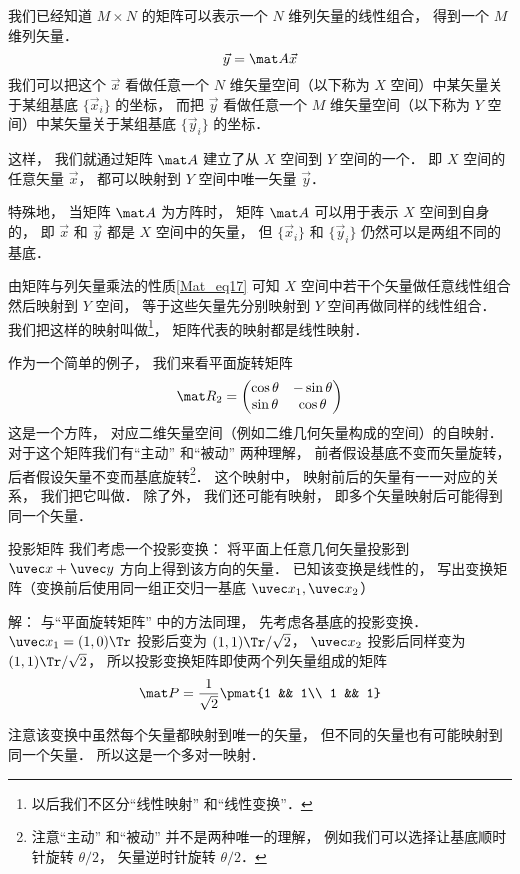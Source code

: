 

我们已经知道 $M\times N$ 的矩阵可以表示一个 $N$ 维列矢量的线性组合， 得到一个 $M$ 维列矢量．
\begin{equation}\label{MatLS_eq1}
\vec y = \mat A \vec x
\end{equation}
我们可以把这个 $\vec x$ 看做任意一个 $N$ 维矢量空间（以下称为 $X$ 空间）中某矢量关于某组基底 $\{\vec x_i\}$ 的坐标， 而把 $\vec y$ 看做任意一个 $M$ 维矢量空间（以下称为 $Y$ 空间）中某矢量关于某组基底 $\{\vec y_i\}$ 的坐标．

这样， 我们就通过矩阵 $\mat A$ 建立了从 $X$ 空间到 $Y$ 空间的一个． 即 $X$ 空间的任意矢量 $\vec x$， 都可以映射到 $Y$ 空间中唯一矢量 $\vec y$．

特殊地， 当矩阵 $\mat A$ 为方阵时， 矩阵 $\mat A$ 可以用于表示 $X$ 空间到自身的， 即 $\vec x$ 和 $\vec y$ 都是 $X$ 空间中的矢量， 但 $\{\vec x_i\}$ 和 $\{\vec y_i\}$ 仍然可以是两组不同的基底．

由矩阵与列矢量乘法的性质\autoref{Mat_eq17} 可知 $X$ 空间中若干个矢量做任意线性组合然后映射到 $Y$ 空间， 等于这些矢量先分别映射到 $Y$ 空间再做同样的线性组合． 我们把这样的映射叫做\footnote{以后我们不区分“线性映射” 和“线性变换”．}， 矩阵代表的映射都是线性映射．

作为一个简单的例子， 我们来看平面旋转矩阵
\begin{equation}
\mat R_2 = \begin{pmatrix}
\cos\theta & - \sin\theta\\
\sin\theta &\cos\theta
\end{pmatrix}
\end{equation}
这是一个方阵， 对应二维矢量空间（例如二维几何矢量构成的空间）的自映射． 对于这个矩阵我们有“主动” 和“被动” 两种理解， 前者假设基底不变而矢量旋转， 后者假设矢量不变而基底旋转\footnote{注意“主动” 和“被动” 并不是两种唯一的理解， 例如我们可以选择让基底顺时针旋转 $\theta/2$， 矢量逆时针旋转 $\theta/2$．}． 这个映射中， 映射前后的矢量有一一对应的关系， 我们把它叫做． 除了外， 我们还可能有映射， 即多个矢量映射后可能得到同一个矢量．

\begin{exam}{投影矩阵}\label{MatLs_ex1}
我们考虑一个投影变换： 将平面上任意几何矢量投影到 $\uvec x + \uvec y$ 方向上得到该方向的矢量． 已知该变换是线性的， 写出变换矩阵（变换前后使用同一组正交归一基底 $\uvec x_1, \uvec x_2$）

解： 与“平面旋转矩阵” 中的方法同理， 先考虑各基底的投影变换． $\uvec x_1 = (1, 0)\Tr$ 投影后变为 $(1, 1)\Tr /\sqrt2$， $\uvec x_2$ 投影后同样变为 $(1, 1)\Tr /\sqrt2$， 所以投影变换矩阵即使两个列矢量组成的矩阵
\begin{equation}
\mat P = \frac{1}{\sqrt{2}} \pmat{1 && 1\\ 1 && 1}
\end{equation}

注意该变换中虽然每个矢量都映射到唯一的矢量， 但不同的矢量也有可能映射到同一个矢量． 所以这是一个多对一映射．
\end{exam}

